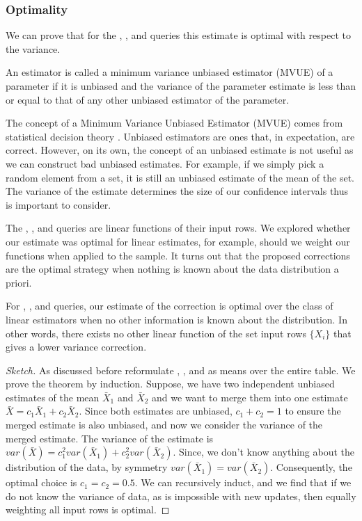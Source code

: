 \subsubsection{Optimality}
We can prove that for the \sumfunc, \countfunc, and \avgfunc queries this estimate is optimal with respect to the variance.
\begin{proposition}
An estimator is called a minimum variance unbiased estimator (MVUE) of a parameter if it is unbiased and the variance of the parameter estimate is less than or equal to that of any other unbiased estimator of the parameter.
\end{proposition}
The concept of a Minimum Variance Unbiased Estimator (MVUE) comes from statistical decision theory \cite{cox1979theoretical}.
Unbiased estimators are ones that, in expectation, are correct.
However, on its own, the concept of an unbiased estimate is not useful as we can construct bad unbiased estimates.
For example, if we simply pick a random element from a set, it is still an unbiased estimate of the mean of the set.
The variance of the estimate determines the size of our confidence intervals thus is important to consider.

The \sumfunc, \countfunc, and \avgfunc queries are linear functions of their input rows.
We explored whether our estimate was optimal for linear estimates, for example, should we weight our functions when applied to the sample.
It turns out that the proposed corrections are the optimal strategy when nothing is known about the data distribution a priori.


\begin{theorem}
For \sumfunc, \countfunc, and \avgfunc queries, our estimate of the correction is optimal over the class of linear estimators when no other information is known about the distribution. 
In other words, there exists no other linear function of the set input rows $\{ X_i \}$ that gives a lower variance correction.
\end{theorem}
\begin{proof}[Sketch]
As discussed before reformulate \sumfunc, \countfunc, and \avgfunc as means over the entire table. We prove the theorem by induction. 
Suppose, we have two independent unbiased estimates of the mean $\bar{X}_1$ and $\bar{X}_2$ and we want to merge them into one estimate $\bar{X} = c_1\bar{X}_1+c_2\bar{X}_2$.
Since both estimates are unbiased, $c_1 + c_2 = 1$ to ensure the merged estimate is also unbiased, and now we consider the variance of the merged estimate.
The variance of the estimate is $var(\bar{X}) = c_1^2var(\bar{X}_1) + c_2^2var(\bar{X}_2)$.
Since, we don't know anything about the distribution of the data, by symmetry $var(\bar{X}_1) = var(\bar{X}_2)$.
Consequently, the optimal choice is $c_1=c_2=0.5$. 
We can recursively induct, and we find that if we do not know the variance of data, as is impossible with new updates, then equally weighting all input rows is optimal. 
\end{proof}
